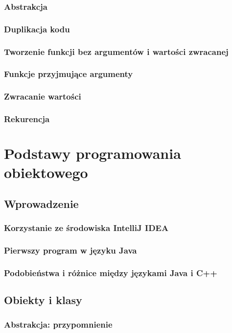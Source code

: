 \documentclass[11pt]{book}
\begin{document}
\section{Abstrakcja}
\section{Duplikacja kodu}
\section{Tworzenie funkcji bez argumentów i wartości zwracanej}
\section{Funkcje przyjmujące argumenty}
\section{Zwracanie wartości}
\section{Rekurencja}


\part{Podstawy programowania obiektowego}
\chapter{Wprowadzenie}
\section{Korzystanie ze środowiska IntelliJ IDEA}
\section{Pierwszy program w języku Java}
\section{Podobieństwa i różnice między językami Java i C++}

\chapter{Obiekty i klasy}
\section{Abstrakcja: przypomnienie}
\end{document}
